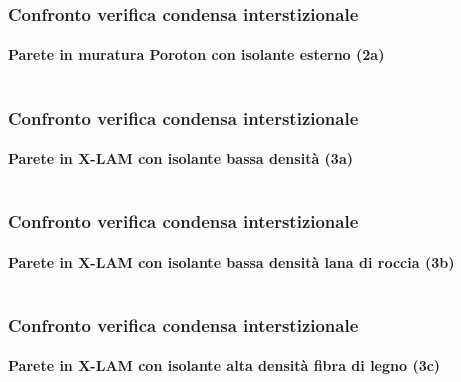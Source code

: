 \documentclass[aspectratio=141,10pt]{beamer}
\begin{document}
\begin{frame}
    \frametitle{Confronto verifica condensa interstizionale}
    \framesubtitle{Parete in muratura Poroton con isolante esterno (2a)}
    \begin{columns}
        \begin{column}{0.45\textwidth}
            \resizebox{\textwidth}{!}{%
            
            }
        \end{column}
        \begin{column}{0.55\textwidth}
            \scriptsize
            
        \end{column}
    \end{columns}
\end{frame}
\begin{frame}
    \frametitle{Confronto verifica condensa interstizionale}
    \framesubtitle{Parete in X-LAM con isolante bassa densità (3a)}
    \begin{columns}
        \begin{column}{0.45\textwidth}
            \resizebox{\textwidth}{!}{%
            
            }
        \end{column}
        \begin{column}{0.55\textwidth}
            \scriptsize
            
        \end{column}
    \end{columns}
\end{frame}
\begin{frame}
    \frametitle{Confronto verifica condensa interstizionale}
    \framesubtitle{Parete in X-LAM con isolante bassa densità lana di roccia (3b)}
    \begin{columns}
        \begin{column}{0.45\textwidth}
            \resizebox{\textwidth}{!}{%
            
            }
        \end{column}
        \begin{column}{0.55\textwidth}
            \scriptsize
            
        \end{column}
    \end{columns}
\end{frame}
\begin{frame}
    \frametitle{Confronto verifica condensa interstizionale}
    \framesubtitle{Parete in X-LAM con isolante alta densità fibra di legno (3c)}
    \begin{columns}
        \begin{column}{0.45\textwidth}
            \resizebox{\textwidth}{!}{%
            
            }
        \end{column}
        \begin{column}{0.55\textwidth}
            \scriptsize
            
        \end{column}
    \end{columns}
\end{frame}
\end{document}
